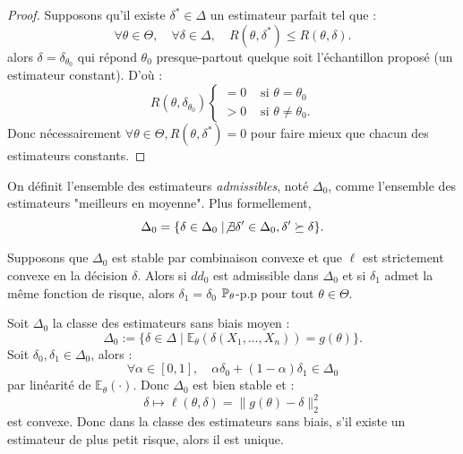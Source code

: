 \begin{proof}
    Supposons qu'il existe $ \delta^* \in \Delta$ un estimateur parfait tel que : 
        $$ \forall \theta \in \Theta, \quad \forall \delta \in \Delta, \quad 
            R(\theta, \delta^*) \leqslant R( \theta, \delta). 
        $$
    alors $ \delta = \delta_{\theta_0}$ qui répond $ \theta_0$ presque-partout 
    quelque soit l'échantillon proposé (un estimateur constant). 
    D'où : 
        $$ R( \theta, \delta_{\theta_0})
            \begin{cases}
                = 0 & \text{ si } \theta = \theta_0 \\ 
                > 0  & \text{ si } \theta \not = \theta_0.
            \end{cases}
        $$ 
    Donc nécessairement $ \forall \theta \in \Theta, R(\theta, \delta^*) = 0$ pour 
    faire mieux que chacun des estimateurs constants. 
\end{proof}

\begin{definition}
    On définit l'ensemble des estimateurs \emph{admissibles}, noté $ \Delta_0$, comme l'ensemble 
    des estimateurs "meilleurs en moyenne". Plus formellement, 
        $$ \Delta_0 = \{ \delta \in \Delta_0 \mid \not \exists \delta' \in \Delta_0, \delta' \succeq \delta\}. $$
\end{definition}

\begin{proposition}
    Supposons que $ \Delta_0$ est stable par combinaison convexe et que $\ell$ est strictement 
    convexe en la décision $ \delta$. Alors si $dd_0$ est admissible dans $ \Delta_0$ 
    et si $ \delta_1$ admet la même fonction de risque, alors $ \delta_1 = \delta_0$ $ \mathbb{P}_\theta$-p.p 
    pour tout $ \theta \in \Theta$. 
\end{proposition}

\begin{example}
    Soit $ \Delta_0$ la classe des estimateurs sans biais moyen : 
        $$ \Delta_0 := \{ \delta \in \Delta \mid \mathbb{E}_\theta( \delta(X_1, \dots, X_n)) = g( \theta)\}. $$ 
    Soit $ \delta_0, \delta_1 \in \Delta_0$, alors : 
        $$ \forall \alpha \in [0,1], \quad \alpha \delta_0 + (1 - \alpha) \delta_1 \in \Delta_0 $$
    par linéarité de $ \mathbb{E}_\theta(\cdot)$. Donc $ \Delta_0$ est bien stable et : 
        $$ \delta \longmapsto \ell(\theta, \delta) = \| g( \theta) - \delta \|_2^2 $$
    est convexe. Donc dans la classe des estimateurs sans biais, s'il existe un estimateur 
    de plus petit risque, alors il est unique. 
\end{example}

